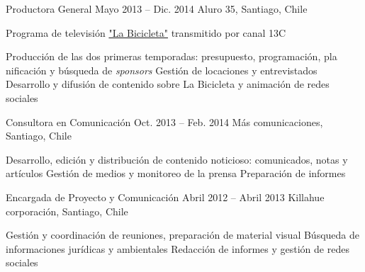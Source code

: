 \begin{joblist}[13.2][7.8][3.9]
{\begin{itemize}
        \end{itemize}
    }



\item[Productora General]{Mayo 2013 -- Dic. 2014}
    {
    Aluro 35, Santiago, Chile
    }
    {
        Programa de televisión \href{http://www.13.cl/c/programas/la-bicicleta}{"La Bicicleta"} transmitido por canal 13C \\
        \iftbftiny \vspace{-0.5cm} \fi
        \begin{itemize}
            \iftbftiny \setlength\itemsep{-3pt} \fi
            \cvitem[\checkmark] Producción de las dos primeras temporadas: presupuesto, programación, pla
            nificación y búsqueda de {\textit{sponsors}}
            \cvitem[\checkmark] Gestión de locaciones y entrevistados
            \cvitem[\checkmark] Desarrollo y difusión de contenido sobre La Bicicleta y animación de redes sociales
        \end{itemize}
    }



\item[Consultora en Comunicación]{Oct. 2013 -- Feb. 2014 }
    {
    Más comunicaciones, Santiago, Chile
    }
    {
        \iftbftiny \vspace{-0.5cm} \fi
        \begin{itemize}
            \iftbftiny \setlength\itemsep{-3pt} \fi
            \cvitem[\checkmark]  Desarrollo, edición y distribución de contenido noticioso: comunicados, notas y artículos
            \cvitem[\checkmark]  Gestión de medios y monitoreo de la prensa 
            \cvitem[\checkmark]  Preparación de informes 
        \end{itemize}
    }

\item[Encargada de Proyecto y Comunicación]{Abril 2012 -- Abril 2013 \vspace{0.2cm}}
    {
    Killahue corporación, Santiago, Chile
    }
    {

        \iftbftiny \vspace{-0.5cm} \fi
        \begin{itemize}
            \iftbftiny \setlength\itemsep{-3pt} \fi
            \cvitem[\checkmark] Gestión y coordinación de reuniones, preparación de material visual
            \cvitem[\checkmark] Búsqueda de informaciones jurídicas y ambientales
            \cvitem[\checkmark] Redacción de informes y gestión de redes sociales
        \end{itemize}
    }




\end{joblist}


